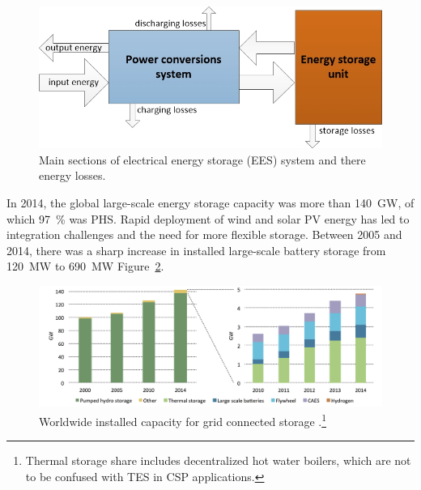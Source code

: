 \begin{figure}[htbp]  
\centering
\includegraphics[width=0.65\linewidth]{FIG/EESSchema}
\caption[Main sections of electrical energy storage system and there energy losses.]{Main sections of electrical energy storage (EES) system and there energy losses.}\label{TCC_EES}
\end{figure}
In 2014, the global large-scale energy storage capacity was more than \SI{140}{\giga\watt}, of which \SI{97}{\percent} was PHS. Rapid deployment of wind and solar PV energy has led to integration challenges and the need for more flexible storage. Between 2005 and 2014, there was a sharp increase in installed large-scale battery storage from \SI{120}{\mega\watt} to \SI{690}{\mega\watt} Figure~\ref{EESgridCapacity}.


\begin{figure}[htbp]  
\centering
\includegraphics[width=1\linewidth]{FIG/EESgridCapacity}
\caption[Worldwide installed capacity for grid connected storage.]{Worldwide installed capacity for grid connected storage \cite{IEA2015}.\footnote{Thermal storage share includes decentralized hot water boilers, which are not to be confused with TES in CSP applications.}}\label{EESgridCapacity}
\end{figure}

